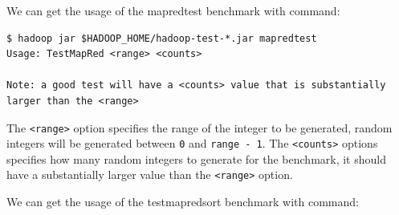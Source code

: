 We can get the usage of the mapredtest benchmark with command:
\lstset{style=bashstyle}
\begin{lstlisting}
$ hadoop jar $HADOOP_HOME/hadoop-test-*.jar mapredtest
Usage: TestMapRed <range> <counts>

Note: a good test will have a <counts> value that is substantially larger than the <range>
\end{lstlisting}
The \verb|<range>| option specifies the range of the integer to be generated, random integers will be generated between \verb|0| and \verb|range - 1|. The \verb|<counts>| options specifies how many random integers to generate for the benchmark, it should have a substantially larger value than the \verb|<range>| option.

We can get the usage of the testmapredsort benchmark with command:
\lstset{style=bashstyle}
